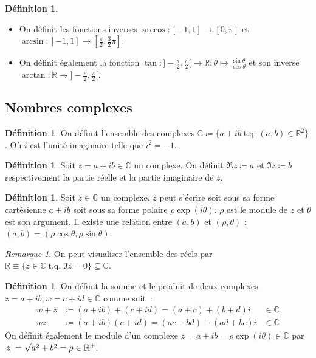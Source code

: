 \documentclass{article}
\DeclareMathOperator{\tq}{\text{ t.q. }}
\newcommand{\R}{\mathbb R}
\newcommand{\C}{\mathbb C}
\renewcommand{\interval}[2]{\left[#1, #2\right]}
\theoremstyle{definition}
\newtheorem{déf}[thm]{Définition}
\theoremstyle{remark}
\newtheorem*{rmq}{Remarque}
\begin{document}
		\begin{déf}~
		\begin{itemize}
			\item On définit les fonctions inverses $\arccos : \interval {-1}1 \to \interval 0\pi$ et $\arcsin : \interval {-1}1 \to \interval {\frac \pi2}{\frac 32\pi}$.
			\item On définit également la fonction $\tan : ]-\frac \pi2, \frac \pi2[ \to \R : \theta \mapsto \frac {\sin\theta}{\cos\theta}$ et son inverse
			      $\arctan : \R \to ]-\frac \pi2, \frac \pi2[$.
		\end{itemize}
		\end{déf}
	
	\subsection{Nombres complexes}
		\begin{déf} On définit l'ensemble des complexes $\C \coloneqq \{a + ib \tq (a, b) \in \R^2\}$. Où $i$ est l'unité imaginaire telle que $i^2 = -1$. \end{déf}
		
		\begin{déf} Soit $z = a + ib \in \C$ un complexe. On définit $\Re z \coloneqq a$ et $\Im z \coloneqq b$ respectivement la partie réelle et la partie
		imaginaire de $z$. \end{déf}

		\begin{déf} Soit $z \in \C$ un complexe. $z$ peut s'écrire soit sous sa forme cartésienne $a + ib$ soit sous sa forme polaire $\rho \exp(i\theta)$. $\rho$
		est le module de $z$ et $\theta$ est son argument. Il existe une relation entre $(a, b)$ et $(\rho, \theta)$ : $(a, b) = (\rho\cos\theta, \rho\sin\theta)$.
		\end{déf}

		\begin{rmq} On peut visualiser l'ensemble des réels par $\R \equiv \{z \in \C \tq \Im z = 0\} \subseteq \C$. \end{rmq}

		\begin{déf} On définit la somme et le produit de deux complexes $z = a+ib, w = c + id \in \C$ comme suit~:
		\begin{align*}
			w+z &\coloneqq (a+ib) + (c+id) = (a+c) + (b+d)i &\in \C \\
			w z &\coloneqq (a+ib)(c+id) = (ac - bd) + (ad+bc)i &\in \C
		\end{align*}
		On définit également le module d'un complexe $z = a+ib = \rho\exp(i\theta) \in \C$ par $\abs z = \sqrt {a^2+b^2} = \rho \in \R^+$. \end{déf}
\end{document}
